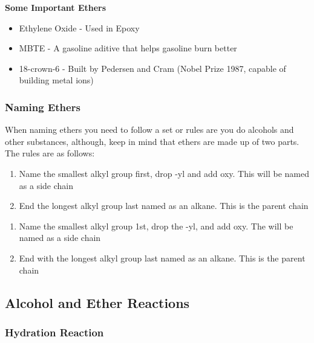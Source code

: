 \documentclass[12pt, a4paper]{article}
\begin{document}
    \noindent\textbf{Some Important Ethers}

    \begin{itemize}
        
        \item Ethylene Oxide - Used in Epoxy
        \item MBTE - A gasoline aditive that helps gasoline burn better
        \item 18-crown-6 - Built by Pedersen and Cram (Nobel Prize 1987, capable of building metal ions)

    \end{itemize}

    \subsubsection{Naming Ethers}
    
    When naming ethers you need to follow a set or rules are you do alcohols and other substances, 
    although, keep in mind that ethers are made up of two parts. The rules are as follows:

    \begin{enumerate}
        \item Name the smallest alkyl group first, drop -yl and add oxy. This will be named as a side chain
        \item End the longest alkyl group last named as an alkane. This is the parent chain
    \end{enumerate}

    \begin{enumerate}
        
        \item Name the smallest alkyl group 1st, drop the -yl, and add oxy. The will
              be named as a side chain
        \item End with the longest alkyl group last named as an alkane. This is the parent chain

    \end{enumerate}

    \subsection{Alcohol and Ether Reactions}

    \subsubsection{Hydration Reaction}
\end{document}
